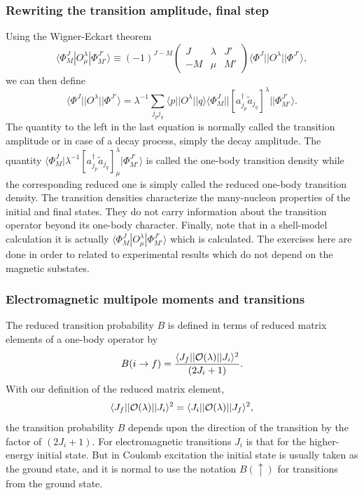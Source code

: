 \documentclass{beamer}
\begin{document}
\begin{frame}
\frametitle{Rewriting the transition amplitude, final step}

\begin{block}{}
Using the Wigner-Eckart theorem
\[
\langle \Phi^J_M|O^{\lambda}_{\mu}|\Phi^{J'}_{M'}\rangle\equiv(-1)^{J-M}\left(\begin{array}{ccc}  J & \lambda & J' \\ -M & \mu & M'\end{array}\right)\langle \Phi^J||O^{\lambda}||\Phi^{J'}\rangle,
\]
we can then define 
\[
\langle \Phi^J||O^{\lambda}||\Phi^{J'}\rangle = \lambda^{-1}\sum_{j_pj_q} \langle p \vert \vert O^{\lambda} \vert\vert q \rangle \langle \Phi_{M}^{J}\vert\vert \left[ a_{j_p}^{\dagger}\tilde{a}_{j_q}\right]^{\lambda}\vert  \vert \Phi_{M'}^{J'}\rangle.
\]
The quantity to the left in the last equation is normally called the transition amplitude or in case of a decay process, simply the decay amplitude.  The quantity 
$\langle \Phi_{M}^{J}\vert \lambda^{-1}\left[ a_{j_p}^{\dagger}\tilde{a}_{j_q}\right]^{\lambda}_{\mu}  \vert \Phi_{M'}^{J'}\rangle$ is called the one-body transition density while the corresponding reduced one is simply called the reduced one-body transition density. 
The transition densities characterize the many-nucleon
properties of the initial  and final states. They do not
carry information about the transition operator beyond its one-body character. 
Finally, note that in a shell-model calculation it is actually $\langle \Phi^J_M|O^{\lambda}_{\mu}|\Phi^{J'}_{M'}\rangle$ which is calculated. The exercises here are done in order to related to experimental results which do not depend on the magnetic substates.
\end{block}
\end{frame}

\begin{frame}
\frametitle{Electromagnetic multipole moments and transitions}

\begin{block}{}
The reduced
transition probability $B$ is defined in terms of reduced matrix
elements of a one-body operator by
\[
B(i \rightarrow f)= \frac{\langle J_{f}||{\cal O}(\lambda )||J_{i}\rangle^{2}}{(2J_{i}+1)}. 
\]
With our definition of the reduced matrix element,
\[
\langle J_{f}||{\cal O}(\lambda )||J_{i}\rangle^{2} =\langle J_{i}||{\cal O}(\lambda )||J_{f}\rangle^{2},  
\]
the transition probability $B$ depends upon the direction of the transition by the factor
of $(2J_{i}+1)$. For electromagnetic
transitions $J_{i}$ is that for the higher-energy initial state. But in
Coulomb excitation the initial state is usually
taken as the ground state, and it is normal to use the notation $B(\uparrow)$ for transitions from the ground state.
\end{block}
\end{frame}
\end{document}
